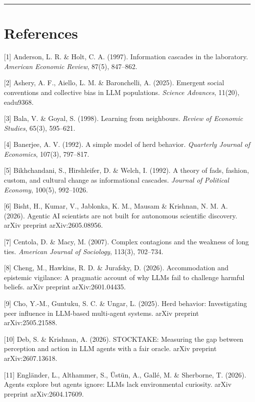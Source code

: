 \documentclass[pdflatex,sn-basic]{sn-jnl}
\begin{document}
\begin{center}\rule{0.5\linewidth}{0.5pt}\end{center}


\section*{References}
\begingroup\small
{[}1{]} Anderson, L. R. \& Holt, C. A. (1997). Information cascades in the laboratory. \emph{American Economic Review}, 87(5), 847--862.

{[}2{]} Ashery, A. F., Aiello, L. M. \& Baronchelli, A. (2025). Emergent social conventions and collective bias in LLM populations. \emph{Science Advances}, 11(20), eadu9368.

{[}3{]} Bala, V. \& Goyal, S. (1998). Learning from neighbours. \emph{Review of Economic Studies}, 65(3), 595--621.

{[}4{]} Banerjee, A. V. (1992). A simple model of herd behavior. \emph{Quarterly Journal of Economics}, 107(3), 797--817.

{[}5{]} Bikhchandani, S., Hirshleifer, D. \& Welch, I. (1992). A theory of fads, fashion, custom, and cultural change as informational cascades. \emph{Journal of Political Economy}, 100(5), 992--1026.

{[}6{]} Bisht, H., Kumar, V., Jablonka, K. M., Mausam \& Krishnan, N. M. A. (2026). Agentic AI scientists are not built for autonomous scientific discovery. arXiv preprint arXiv:2605.08956.

{[}7{]} Centola, D. \& Macy, M. (2007). Complex contagions and the weakness of long ties. \emph{American Journal of Sociology}, 113(3), 702--734.

{[}8{]} Cheng, M., Hawkins, R. D. \& Jurafsky, D. (2026). Accommodation and epistemic vigilance: A pragmatic account of why LLMs fail to challenge harmful beliefs. arXiv preprint arXiv:2601.04435.

{[}9{]} Cho, Y.-M., Guntuku, S. C. \& Ungar, L. (2025). Herd behavior: Investigating peer influence in LLM-based multi-agent systems. arXiv preprint arXiv:2505.21588.

{[}10{]} Deb, S. \& Krishnan, A. (2026). STOCKTAKE: Measuring the gap between perception and action in LLM agents with a fair oracle. arXiv preprint arXiv:2607.13618.

{[}11{]} Engländer, L., Althammer, S., Üstün, A., Gallé, M. \& Sherborne, T. (2026). Agents explore but agents ignore: LLMs lack environmental curiosity. arXiv preprint arXiv:2604.17609.
\end{document}
